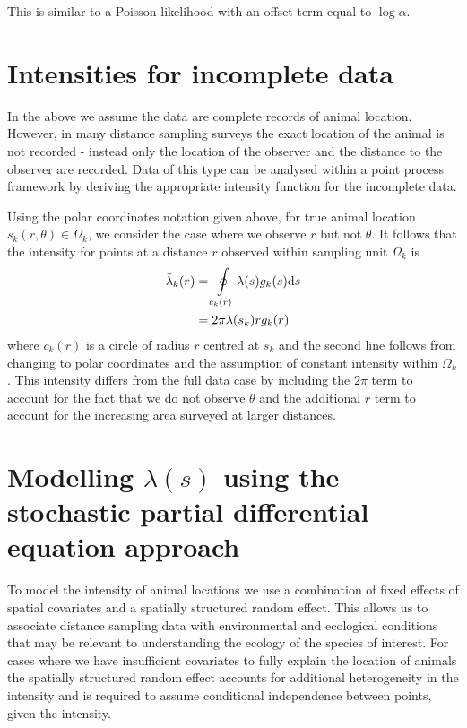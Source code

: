 \documentclass[preprint,12pt]{elsarticle}
\newcommand{\tl}{\tilde{\lambda}}   %
\begin{document}
This is similar to a Poisson likelihood with an offset term equal to $\log\alpha$.


\section*{Intensities for incomplete data}

In the above we assume the data are complete records of animal location.  However, in many distance sampling surveys the exact location of the animal is not recorded - instead only the location of the observer and the distance to the observer are recorded.  Data of this type can be analysed within a point process framework by deriving the appropriate intensity function for the incomplete data.

Using the polar coordinates notation given above, for true animal location $s_k(r, \theta) \in \Omega_k$, we consider the case where we observe $r$ but not $\theta$.  It follows that the intensity for points at a distance $r$ observed within sampling unit $\Omega_k$ is
\begin{align}
\tl_k(r) &= \oint\displaylimits_{c_k(r)} \lambda(s)g_k(s)\mathrm{d}s \nonumber \\
&= 2\pi\lambda(s_k)rg_k(r)
\end{align}
 where $c_k(r)$ is a circle of radius $r$ centred at $s_k$ and the second line follows from changing to polar coordinates and the assumption of constant intensity within $\Omega_k$.  This intensity differs from the full data case by including the $2\pi$  term to account for the fact that we do not observe $\theta$ and the additional $r$ term to account for the increasing area surveyed at larger distances.  
 
\section*{Modelling $\lambda(s)$ using the stochastic partial differential equation approach}

To model the intensity of animal locations we use a combination of fixed effects of spatial covariates and a spatially structured random effect.  This allows us to associate distance sampling data with environmental and ecological conditions that may be relevant to understanding the ecology of the species of interest.  For cases where we have insufficient covariates to fully explain the location of animals the spatially structured random effect accounts for additional heterogeneity in the intensity and is required to assume conditional independence between points, given the intensity.  
\end{document}

